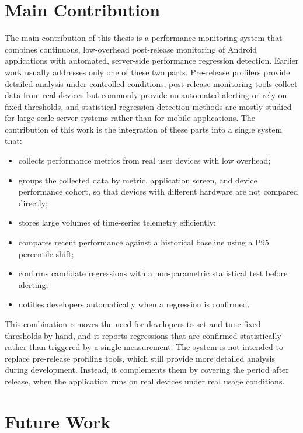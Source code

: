 \section{Main Contribution}
\label{sec:concl_contribution}

The main contribution of this thesis is a performance monitoring system that combines continuous, low-overhead post-release monitoring of Android applications with automated, server-side performance regression detection. Earlier work usually addresses only one of these two parts. Pre-release profilers provide detailed analysis under controlled conditions, post-release monitoring tools collect data from real devices but commonly provide no automated alerting or rely on fixed thresholds, and statistical regression detection methods are mostly studied for large-scale server systems rather than for mobile applications. The contribution of this work is the integration of these parts into a single system that:

\begin{itemize}
      \item collects performance metrics from real user devices with low overhead;
      \item groups the collected data by metric, application screen, and device performance cohort, so that devices with different hardware are not compared directly;
      \item stores large volumes of time-series telemetry efficiently;
      \item compares recent performance against a historical baseline using a P95 percentile shift;
      \item confirms candidate regressions with a non-parametric statistical test before alerting;
      \item notifies developers automatically when a regression is confirmed.
\end{itemize}

This combination removes the need for developers to set and tune fixed thresholds by hand, and it reports regressions that are confirmed statistically rather than triggered by a single measurement. The system is not intended to replace pre-release profiling tools, which still provide more detailed analysis during development. Instead, it complements them by covering the period after release, when the application runs on real devices under real usage conditions.

\section{Future Work}
\label{sec:concl_future}

